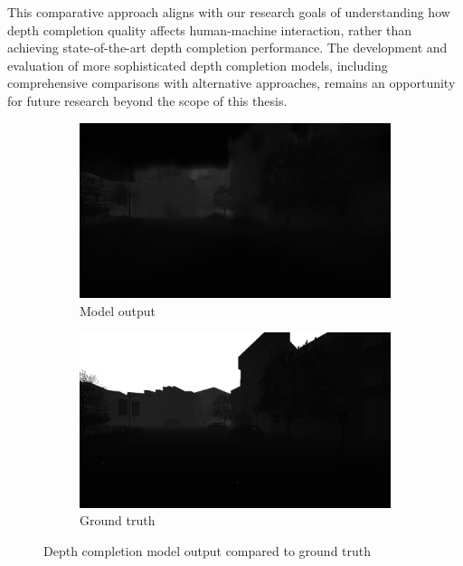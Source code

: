 This comparative approach aligns with our research goals of understanding how depth completion quality affects human-machine interaction, rather than achieving state-of-the-art depth completion performance. The development and evaluation of more sophisticated depth completion models, including comprehensive comparisons with alternative approaches, remains an opportunity for future research beyond the scope of this thesis.

\begin{figure}[h]
    \centering
    \begin{subfigure}{0.48\textwidth}
        \includegraphics[width=\textwidth]{figures/depth_pred.png}
        \caption{Model output}
        \label{fig:depth_pred}
    \end{subfigure}
    \hfill
    \begin{subfigure}{0.48\textwidth}
        \includegraphics[width=\textwidth]{figures/depth_gt_2.png}
        \caption{Ground truth}
        \label{fig:depth_gt_2}
    \end{subfigure}
    \caption{Depth completion model output compared to ground truth}
    \label{fig:depth_model_comparison}
    \end{figure}


